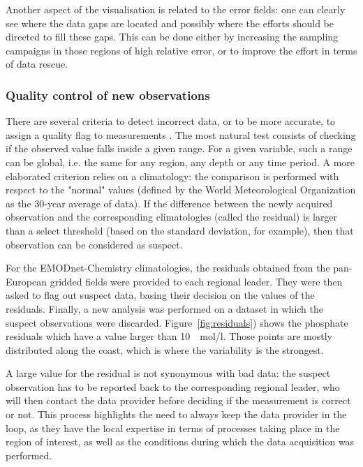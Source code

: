 \documentclass[essd,manuscript]{copernicus}
\begin{document}
Another aspect of the visualisation is related to the error fields: one can clearly see where the data gaps are located and possibly where the efforts should be directed to fill these gaps. This can be done either by increasing the sampling campaigns in those regions of high relative error, or to improve the effort in terms of data rescue.

\subsubsection{Quality control of new observations}

There are several criteria to detect incorrect data, or to be more accurate, to assign a quality flag to measurements \citep{CUMMINGS2011,CABANES2021}. The most natural test consists of checking if the observed value falls inside a given range. For a given variable, such a range can be global, i.e. the same for any region, any depth or any time period. A more elaborated criterion relies on a climatology: the comparison is performed with respect to the "normal" values (defined by the World Meteorological Organization as the 30-year average of data). If the difference between the newly acquired observation and the corresponding climatologies (called the residual) is larger than a select threshold (based on the standard deviation, for example), then that observation can be considered as suspect.

For the EMODnet-Chemistry climatologies, the residuals obtained from the pan-European gridded fields were provided to each regional leader. They were then asked to flag out suspect data, basing their decision on the values of the residuals. Finally, a new analysis was performed on a dataset in which the suspect observations were discarded. Figure~\ref{fig:residuals}) shows the phosphate residuals which have a value larger than 10~\unit{\mu~mol/l}. Those points are mostly distributed along the coast, which is where the variability is the strongest. 

A large value for the residual is not synonymous with bad data: the suspect observation has to be reported back to the corresponding regional leader, who will then contact the data provider before deciding if the measurement is correct or not. This process highlights the need to always keep the data provider in the loop, as they have the local expertise in terms of processes taking place in the region of interest, as well as the conditions during which the data acquisition was performed. 
\end{document}
